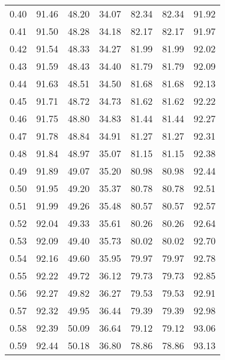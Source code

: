 \begin{tabular}{|c|c|c|c|c|c|c|}
      0.40 &     91.46 &     48.20 &      34.07 &   82.34 &      82.34 &         91.92 \\
      0.41 &     91.50 &     48.28 &      34.18 &   82.17 &      82.17 &         91.97 \\
      0.42 &     91.54 &     48.33 &      34.27 &   81.99 &      81.99 &         92.02 \\
      0.43 &     91.59 &     48.43 &      34.40 &   81.79 &      81.79 &         92.09 \\
      0.44 &     91.63 &     48.51 &      34.50 &   81.68 &      81.68 &         92.13 \\
      0.45 &     91.71 &     48.72 &      34.73 &   81.62 &      81.62 &         92.22 \\
      0.46 &     91.75 &     48.80 &      34.83 &   81.44 &      81.44 &         92.27 \\
      0.47 &     91.78 &     48.84 &      34.91 &   81.27 &      81.27 &         92.31 \\
      0.48 &     91.84 &     48.97 &      35.07 &   81.15 &      81.15 &         92.38 \\
      0.49 &     91.89 &     49.07 &      35.20 &   80.98 &      80.98 &         92.44 \\
      0.50 &     91.95 &     49.20 &      35.37 &   80.78 &      80.78 &         92.51 \\
      0.51 &     91.99 &     49.26 &      35.48 &   80.57 &      80.57 &         92.57 \\
      0.52 &     92.04 &     49.33 &      35.61 &   80.26 &      80.26 &         92.64 \\
      0.53 &     92.09 &     49.40 &      35.73 &   80.02 &      80.02 &         92.70 \\
      0.54 &     92.16 &     49.60 &      35.95 &   79.97 &      79.97 &         92.78 \\
      0.55 &     92.22 &     49.72 &      36.12 &   79.73 &      79.73 &         92.85 \\
      0.56 &     92.27 &     49.82 &      36.27 &   79.53 &      79.53 &         92.91 \\
      0.57 &     92.32 &     49.95 &      36.44 &   79.39 &      79.39 &         92.98 \\
      0.58 &     92.39 &     50.09 &      36.64 &   79.12 &      79.12 &         93.06 \\
      0.59 &     92.44 &     50.18 &      36.80 &   78.86 &      78.86 &         93.13 \\

\end{tabular}
